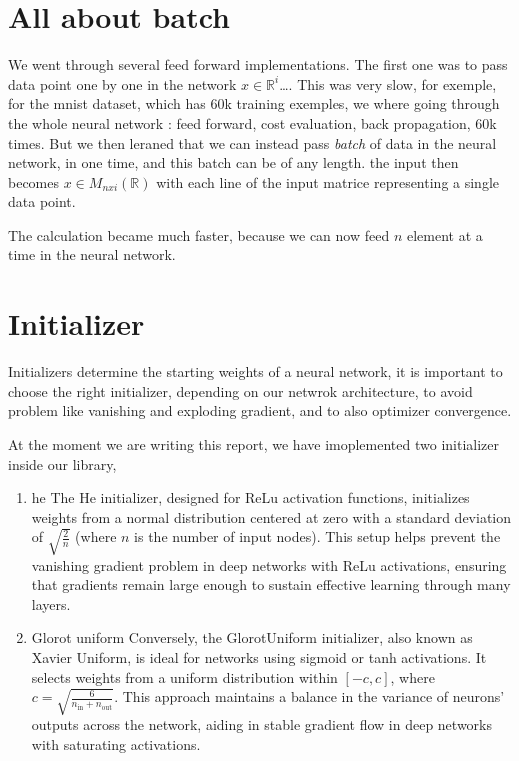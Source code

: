 \documentclass[a4paper, twocolumn, twoside]{article}
\begin{document}
	\section{All about batch}
	We went through several feed forward implementations. The first one was to pass data point one by one in the network
	$x \in \mathbb{R}^{i}$\dots. This was very slow, for exemple, for the mnist dataset, which has 60k training exemples,
	we where going through the whole neural network : feed forward, cost evaluation, back propagation, 60k times.
	But we then leraned that we can instead pass \textit{batch} of data in the neural network, in one time, and this batch can
	be of any length.
	the input then becomes $x \in M_{nxi} (\mathbb{R})$ with each line of the input matrice representing a single data point.

	The calculation became much faster, because we can now feed $n$ element at a time in the neural network.

	\section{Initializer}
	Initializers determine the starting weights of a neural network, it is important to choose the right initializer, depending
	on our netwrok architecture, to avoid problem like vanishing and exploding gradient, and to also optimizer convergence.

	At the moment we are writing this report, we have imoplemented two initializer inside our library,

	\begin{enumerate}
		\item{he}
	The He initializer, designed for ReLu activation functions,
	initializes weights from a normal distribution centered at zero with a standard deviation of 
	$\sqrt{\frac{2}{n}}$ (where $n$ is the number of input nodes).
	This setup helps prevent the vanishing gradient problem in deep networks with ReLu activations,
	ensuring that gradients remain large enough to sustain effective learning through many layers.
		\item{Glorot uniform}
	Conversely, the GlorotUniform initializer, 
	also known as Xavier Uniform, is ideal for networks using sigmoid or tanh activations.
	It selects weights from a uniform distribution within $[-c, c]$,
	where $c = \sqrt{\frac{6}{n_{\text{in}} + n_{\text{out}}}}$.
	This approach maintains a balance in the variance of neurons' outputs across the network,
	aiding in stable gradient flow in deep networks with saturating activations.
	\end{enumerate}
\end{document}
